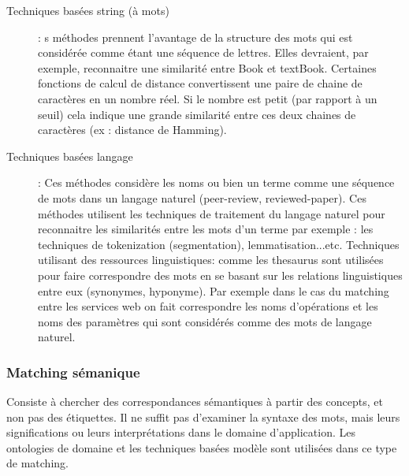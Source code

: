     \SpecialItem
    \begin{description}
    \item [Techniques basées string (à mots)]: s méthodes prennent
      l’avantage de la structure des mots qui est considérée comme
      étant une séquence de lettres. Elles devraient, par exemple,
      reconnaitre une similarité entre Book et textBook. Certaines
      fonctions de calcul de distance convertissent une paire de
      chaine de caractères en un nombre réel. Si le nombre est petit
      (par rapport à un seuil) cela indique une grande similarité
      entre ces deux chaines de caractères (ex : distance de Hamming).

    \item [Techniques basées langage]: Ces méthodes considère les noms
      ou bien un terme comme une séquence de mots dans un langage
      naturel (peer-review, reviewed-paper).  Ces méthodes utilisent
      les techniques de traitement du langage naturel pour reconnaitre
      les similarités entre les mots d’un terme par exemple : les
      techniques de tokenization (segmentation), lemmatisation...etc.
      Techniques utilisant des ressources linguistiques: comme les
      thesaurus sont utilisées pour faire correspondre des mots en se
      basant sur les relations linguistiques entre eux (synonymes,
      hyponyme). Par exemple dans le cas du matching entre les
      services web on fait correspondre les noms d’opérations et les
      noms des paramètres qui sont considérés comme des mots de
      langage naturel.
    \end{description}

    \subsubsection{Matching sémanique}
    \label{sec:matching-semanique}
    Consiste à chercher des correspondances sémantiques à partir des
    concepts, et non pas des étiquettes. Il ne suffit pas d'examiner
    la syntaxe des mots, mais leurs significations ou leurs
    interprétations dans le domaine d’application. Les ontologies de
    domaine et les techniques basées modèle sont utilisées dans ce
    type de matching.

